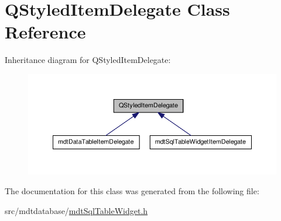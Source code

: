 \hypertarget{class_q_styled_item_delegate}{\section{Q\-Styled\-Item\-Delegate Class Reference}
\label{class_q_styled_item_delegate}
}


Inheritance diagram for Q\-Styled\-Item\-Delegate\-:
\nopagebreak
\begin{figure}[H]
\begin{center}
\leavevmode
\includegraphics[width=350pt]{class_q_styled_item_delegate__inherit__graph}
\end{center}
\end{figure}


The documentation for this class was generated from the following file\-:\begin{DoxyCompactItemize}
\item 
src/mdtdatabase/\hyperlink{mdt_sql_table_widget_8h}{mdt\-Sql\-Table\-Widget.\-h}\end{DoxyCompactItemize}
